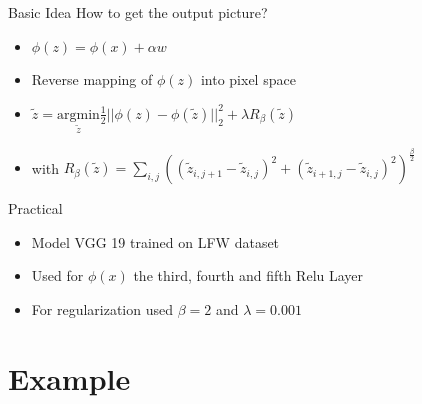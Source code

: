 \documentclass[11pt]{beamer}
\begin{document}
\begin{frame}{Basic Idea}
	How to get the output picture?
	\begin{itemize}
		\item $\phi(z) = \phi(x) + \alpha w$
		\item Reverse mapping of $\phi(z)$ into pixel space
		\item $\tilde{z} = \underset{\tilde{z}}{\mathrm{argmin}} \frac{1}{2} ||\phi(z)-\phi(\tilde{z})||_2^2 + \lambda R_{\beta}(\tilde{z})$ 
		\item with $R_{\beta}(\tilde{z}) = \sum_{i,j}((\tilde{z}_{i,j+1}-\tilde{z}_{i,j})^2 + (\tilde{z}_{i+1,j}-\tilde{z}_{i,j})^2)^{\frac{\beta}{2}}$
		 
	\end{itemize}
	
\end{frame}

\begin{frame}{Practical}
	\begin{itemize}
		\item Model VGG 19 trained on LFW dataset
		\item Used for $\phi(x)$ the third, fourth and fifth Relu Layer
		\item For regularization used $\beta=2$ and $\lambda = 0.001$ 
	\end{itemize} 
\end{frame}

\section{Example}

\end{document}
